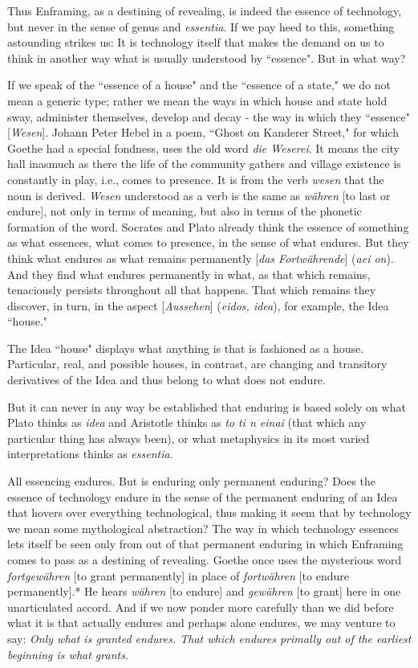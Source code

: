 Thus Enframing, as a destining of revealing, is indeed the essence of technology, but never in the sense of genus and \textit{essentia}. If we pay heed to this, something astounding strikes us: It is technology itself that makes the demand on us to think in another way what is usually understood by ``essence". But in what way?

If we speak of the ``essence of a house" and the ``essence of a state," we do not mean a generic type; rather we mean the ways in which house and state hold sway, administer themselves, develop and decay - the way in which they ``essence" [\textit{Wesen}]. Johann Peter Hebel in a poem, ``Ghost on Kanderer Street," for which Goethe had a special fondness, uses the old word \textit{die Weserei}. It means the city hall inasmuch as there the life of the community gathers and village existence is constantly in play, i.e., comes to presence. It is from the verb \textit{wesen} that the noun is derived. \textit{Wesen} understood as a verb is the same as \textit{w\"{a}hren} [to last or endure], not only in terms of meaning, but also in terms of the phonetic formation of the word. Socrates and Plato already think the essence of something as what essences, what comes to presence, in the sense of what endures. But they think what endures as what remains permanently [\textit{das Fortw\"{a}hrende}] (\textit{aei on}). And they find what endures permanently in what, as that which remains, tenaciously persists throughout all that happens. That which remains they discover, in turn, in the aspect [\textit{Aussehen}] (\textit{eidos, idea}), for example, the Idea ``house."

The Idea ``house" displays what anything is that is fashioned as a house. Particular, real, and possible houses, in contrast, are changing and transitory derivatives of the Idea and thus belong to what does not endure.

But it can never in any way be established that enduring is based solely on what Plato thinks as \textit{idea} and Aristotle thinks as \textit{to ti n einai} (that which any particular thing has always been), or what metaphysics in its most varied interpretations thinks as \textit{essentia}.

All essencing endures. But is enduring only permanent enduring? Does the essence of technology endure in the sense of the permanent enduring of an Idea that hovers over everything technological, thus making it seem that by technology we mean some mythological abstraction? The way in which technology essences lets itself be seen only from out of that permanent enduring in which Enframing comes to pass as a destining of revealing. Goethe once uses the mysterious word \textit{fortgew\"{a}hren} [to grant permanently] in place of \textit{fortw\"{a}hren} [to endure permanently].* He hears \textit{w\"{a}hren} [to endure] and \textit{gew\"{a}hren} [to grant] here in one unarticulated accord. And if we now ponder more carefully than we did before what it is that actually endures and perhaps alone endures, we may venture to say: \textit{Only what is granted endures. That which endures primally out of the earliest beginning is what grants}. 


